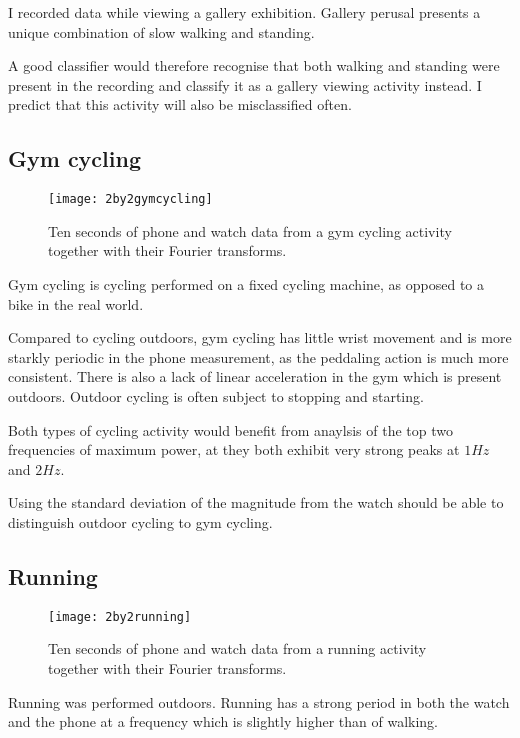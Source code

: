       I recorded data while viewing a gallery exhibition. Gallery perusal presents a unique combination of slow walking and standing.
      
      A good classifier would therefore recognise that both walking and standing were present in the recording and classify it as a gallery viewing activity instead. I predict that this activity will also be misclassified often.
    \subsection{Gym cycling}
      \begin{figure}[!th]
        \centering
        \texttt{[image: 2by2gymcycling]}
        \caption{Ten seconds of phone and watch data from a gym cycling activity together with their Fourier transforms.}
        \label{fig:2by2gymcycling}
      \end{figure}
      
      Gym cycling is cycling performed on a fixed cycling machine, as opposed to a bike in the real world.
      
      Compared to cycling outdoors, gym cycling has little wrist movement and is more starkly periodic in the phone measurement, as the peddaling action is much more consistent. There is also a lack of linear acceleration in the gym which is present outdoors. Outdoor cycling is often subject to stopping and starting.
      
      Both types of cycling activity would benefit from anaylsis of the top two frequencies of maximum power, at they both exhibit very strong peaks at $1 \si{Hz}$ and $2 \si{Hz}$.
      
      Using the standard deviation of the magnitude from the watch should be able to distinguish outdoor cycling to gym cycling.
    \subsection{Running}
      \begin{figure}[!th]
        \centering
        \texttt{[image: 2by2running]}
        \caption{Ten seconds of phone and watch data from a running activity together with their Fourier transforms.}
        \label{fig:2by2running}
      \end{figure}
      
      Running was performed outdoors. Running has a strong period in both the watch and the phone at a frequency which is slightly higher than of walking.
      
